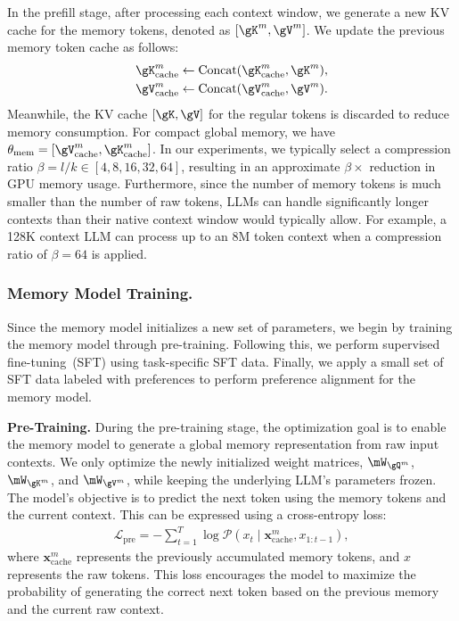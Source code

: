 \documentclass[sigconf]{acmart}
\begin{document}
In the prefill stage, after processing each context window, we generate a new KV cache for the memory tokens, denoted as $[\gK^m, \gV^m]$. We update the previous memory token cache as follows:
\begin{align}
\gK^m_{\text{cache}} &\leftarrow \text{Concat}(\gK^m_\text{cache}, \gK^m), \\
\gV^m_{\text{cache}} &\leftarrow \text{Concat}(\gV^m_\text{cache}, \gV^m).
\end{align}
Meanwhile, the KV cache $[\gK, \gV]$ for the regular tokens is discarded to reduce memory consumption. For compact global memory, we have $\theta_{\text{mem}}=[\gV^m_{\text{cache}},\gK^m_{\text{cache}}]$. 
In our experiments, we typically select a compression ratio $\beta = l/k \in [4, 8, 16, 32, 64]$, resulting in an approximate $\beta \times$ reduction in GPU memory usage. Furthermore, since the number of memory tokens is much smaller than the number of raw tokens, LLMs can handle significantly longer contexts than their native context window would typically allow. For example, a 128K context LLM can process up to an 8M token context when a compression ratio of $\beta = 64$ is applied.

\subsubsection{Memory Model Training.}
Since the memory model initializes a new set of parameters, we begin by training the memory model through pre-training. Following this, we perform supervised fine-tuning~(SFT) using task-specific SFT data. Finally, we apply a small set of SFT data labeled with preferences to perform preference alignment for the memory model.

\textbf{Pre-Training.}
During the pre-training stage, the optimization goal is to enable the memory model to generate a global memory representation from raw input contexts.
We only optimize the newly initialized weight matrices, $\mW_{\gQ^m}$, $\mW_{\gK^m}$, and $\mW_{\gV^m}$, while keeping the underlying LLM’s parameters frozen. The model’s objective is to predict the next token using the memory tokens and the current context. This can be expressed using a cross-entropy loss:
\begin{align}
    \mathcal{L}_{\text{pre}} = - \sum_{t=1}^{T} \log \mathcal{P}(x_t \mid \bm{x}^m_{\text{cache}}, x_{1:t-1}),
\end{align}
where $\bm{x}^m_{\text{cache}}$ represents the previously accumulated memory tokens, and $x$ represents the raw tokens. This loss encourages the model to maximize the probability of generating the correct next token based on the previous memory and the current raw context.
\end{document}
